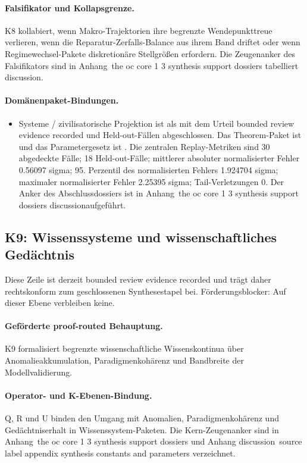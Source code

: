 \paragraph{Falsifikator und Kollapsgrenze.}
K8 kollabiert, wenn Makro-Trajektorien ihre begrenzte Wendepunkttreue verlieren, wenn die Reparatur-Zerfalls-Balance aus ihrem Band driftet oder wenn Regimewechsel-Pakete diskretionäre Stellgrößen erfordern.
Die Zeugenanker des Falsifikators sind in Anhang~the oc core 1 3 synthesis support dossiers tabelliert discussion.

\paragraph{Domänenpaket-Bindungen.}
\begin{itemize}[leftmargin=1.6em,nosep]
\item Systeme / zivilisatorische Projektion ist als  mit dem Urteil bounded review evidence recorded und  Held-out-Fällen abgeschlossen. Das Theorem-Paket ist  und das Parametergesetz ist . Die zentralen Replay-Metriken sind 30 abgedeckte Fälle; 18 Held-out-Fälle; mittlerer absoluter normalisierter Fehler 0.56097 sigma; 95. Perzentil des normalisierten Fehlers 1.924704 sigma; maximaler normalisierter Fehler 2.25395 sigma; Tail-Verletzungen 0. Der Anker des Abschlussdossiers ist in Anhang~the oc core 1 3 synthesis support dossiers discussionaufgeführt.
\end{itemize}

\subsection{K9: Wissenssysteme und wissenschaftliches Gedächtnis}
\label{sec:oc-core-1-3-synthesis-k9}
Diese Zeile ist derzeit bounded review evidence recorded und trägt daher rechtskonform zum geschlossenen Synthesestapel bei.
Förderungsblocker: Auf dieser Ebene verbleiben keine.

\paragraph{Geförderte proof-routed Behauptung.}
K9 formalisiert begrenzte wissenschaftliche Wissenskontinua über Anomalieakkumulation, Paradigmenkohärenz und Bandbreite der Modellvalidierung.

\paragraph{Operator- und K-Ebenen-Bindung.}
Q, R und U binden den Umgang mit Anomalien, Paradigmenkohärenz und Gedächtniserhalt in Wissenssystem-Paketen.
Die Kern-Zeugenanker sind in Anhang~the oc core 1 3 synthesis support dossiers und Anhang discussion~source label appendix synthesis constants and parameters verzeichnet.

